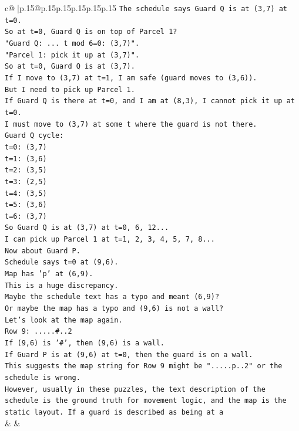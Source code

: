 \documentclass{article}
\begin{document}
{\begin{supertabular}{c@{$\;$}|p{.15\linewidth}@{}p{.15\linewidth}p{.15\linewidth}p{.15\linewidth}p{.15\linewidth}p{.15\linewidth}}
{{{\texttt{The schedule says Guard Q is at (3,7) at t=0.} \\
\texttt{So at t=0, Guard Q is on top of Parcel 1?} \\
\texttt{"Guard Q: ... t mod 6=0: (3,7)".} \\
\texttt{"Parcel 1: pick it up at (3,7)".} \\
\texttt{So at t=0, Guard Q is at (3,7).} \\
\texttt{If I move to (3,7) at t=1, I am safe (guard moves to (3,6)).} \\
\texttt{But I need to pick up Parcel 1.} \\
\texttt{If Guard Q is there at t=0, and I am at (8,3), I cannot pick it up at t=0.} \\
\texttt{I must move to (3,7) at some t where the guard is not there.} \\
\texttt{Guard Q cycle:} \\
\texttt{t=0: (3,7)} \\
\texttt{t=1: (3,6)} \\
\texttt{t=2: (3,5)} \\
\texttt{t=3: (2,5)} \\
\texttt{t=4: (3,5)} \\
\texttt{t=5: (3,6)} \\
\texttt{t=6: (3,7)} \\
\texttt{So Guard Q is at (3,7) at t=0, 6, 12...} \\
\texttt{I can pick up Parcel 1 at t=1, 2, 3, 4, 5, 7, 8...} \\
\texttt{Now about Guard P.} \\
\texttt{Schedule says t=0 at (9,6).} \\
\texttt{Map has 'p' at (6,9).} \\
\texttt{This is a huge discrepancy.} \\
\texttt{Maybe the schedule text has a typo and meant (6,9)?} \\
\texttt{Or maybe the map has a typo and (9,6) is not a wall?} \\
\texttt{Let's look at the map again.} \\
\texttt{Row 9: .....\#..2} \\
\texttt{If (9,6) is '\#', then (9,6) is a wall.} \\
\texttt{If Guard P is at (9,6) at t=0, then the guard is on a wall.} \\
\texttt{This suggests the map string for Row 9 might be ".....p..2" or the schedule is wrong.} \\
\texttt{However, usually in these puzzles, the text description of the schedule is the ground truth for movement logic, and the map is the static layout. If a guard is described as being at a} \\
            }
        }
    }
    & & \\ \\


\end{supertabular}}
\end{document}
